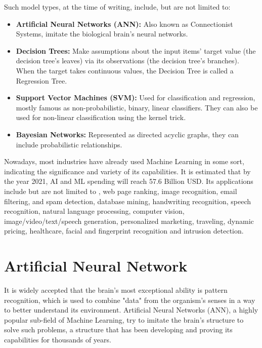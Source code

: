 Such model types, at the time of writing, include, but are not limited to:
\begin{itemize}
	\item \textbf{Artificial Neural Networks (ANN):} Also known as Connectionist Systems, imitate the biological brain's neural networks.
	\item \textbf{Decision Trees:} Make assumptions about the input items' target value (the decision tree's leaves) via its observations (the decision tree's branches). When the target takes continuous values, the Decision Tree is called a Regression Tree.
	\item \textbf{Support Vector Machines (SVM):} Used for classification and regression, most\-ly famous as non-probabilistic, binary, linear classifiers. They can also be used for non-linear classification using the kernel trick.
	\item \textbf{Bayesian Networks:} Represented as directed acyclic graphs, they can include probabilistic relationships.
\end{itemize}

Nowadays, most industries have already used Machine Learning in some sort, indicating the significance and variety of its capabilities. It is estimated \cite{Machine-Learning-Applications} that by the year 2021, AI and ML spending will reach 57.6 Billion USD. Its applications include but are not limited to \cite{Top-Machine-Learning-Applications-in-2019} \cite{Roundup-Of-Machine-Learning-Forecasts-And-Market-Estimates}, web page ranking, image recognition, email filtering, and spam detection, database mining, handwriting recognition, speech recognition, natural language processing, computer vision, image/video/text/speech generation, personalized marketing, traveling, dynamic pricing, healthcare, facial and fingerprint recognition and intrusion detection.

\section{Artificial Neural Network}
It is widely accepted that the brain's most exceptional ability is pattern recognition, which is used to combine "data" from the organism's senses in a way to better understand its environment. Artificial Neural Networks (ANN), a highly popular sub-field of Machine Learning, try to imitate the brain's structure to solve such problems, a structure that has been developing and proving its capabilities for thousands of years.

